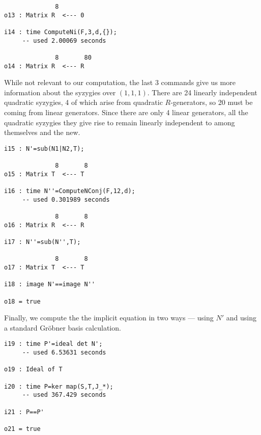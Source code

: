 \documentclass[fleqn,reqno]{amsart}
\numberwithin{first}{chapter}
\begin{document}
\begin{example}[$\mt{ex601}$]
\begin{verbatim}
              8
o13 : Matrix R  <--- 0

i14 : time ComputeNi(F,3,d,{});
     -- used 2.00069 seconds

              8       80
o14 : Matrix R  <--- R
\end{verbatim}
While not relevant to our computation, the last 3 commands give us more information
about the syzygies over $(1,1,1)$.
There are 24 linearly independent quadratic syzygies,
4 of which arise from quadratic $R$-generators, so 20 must be coming from linear generators.
Since there are only 4 linear generators, all the quadratic syzygies they give rise to
remain linearly independent to among themselves and the new.

\begin{verbatim}
i15 : N'=sub(N1|N2,T);

              8       8
o15 : Matrix T  <--- T

i16 : time N''=ComputeNConj(F,12,d);
     -- used 0.301989 seconds

              8       8
o16 : Matrix R  <--- R

i17 : N''=sub(N'',T);

              8       8
o17 : Matrix T  <--- T

i18 : image N'==image N''

o18 = true
\end{verbatim}
Finally, we compute the the implicit equation in two ways --- using $N'$ and
using a standard Gr\"obner basis calculation.

\begin{verbatim}
i19 : time P'=ideal det N';
     -- used 6.53631 seconds

o19 : Ideal of T

i20 : time P=ker map(S,T,J_*);
     -- used 367.429 seconds

i21 : P==P'

o21 = true
\end{verbatim}
\end{example}
\end{document}
